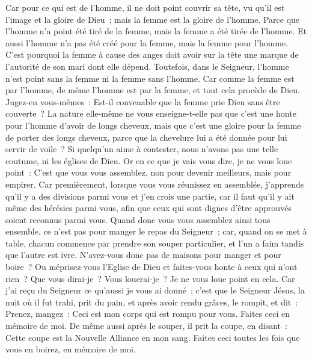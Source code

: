 \begin{multicols}{2}
Car pour ce qui est de l'homme, il ne doit point couvrir sa tête, vu qu'il est l'image et la gloire de Dieu~; mais la femme est la gloire de l'homme.
Parce que l'homme n'a point été tiré de la femme, mais la femme a été tirée de l'homme.
Et aussi l'homme n'a pas été créé pour la femme, mais la femme pour l'homme.
C'est pourquoi la femme à cause des anges doit avoir sur la tête une marque de l'autorité de son mari dont elle dépend.
Toutefois, dans le Seigneur, l'homme n'est point sans la femme ni la femme sans l'homme.
Car comme la femme est par l'homme, de même l'homme est par la femme, et tout cela procède de Dieu.
Jugez-en vous-mêmes~: Est-il convenable que la femme prie Dieu sans être couverte~?
La nature elle-même ne vous enseigne-t-elle pas que c'est une honte pour l'homme d'avoir de longs cheveux,
mais que c'est une gloire pour la femme de porter des longs cheveux, parce que la chevelure lui a été donnée pour lui servir de voile~?
Si quelqu'un aime à contester, nous n'avons pas une telle coutume, ni les églises de Dieu.
Or en ce que je vais vous dire, je ne vous loue point~: C'est que vous vous assemblez, non pour devenir meilleurs, mais pour empirer.
Car premièrement, lorsque vous vous réunissez en assemblée, j'apprends qu'il y a des divisions parmi vous et j'en crois une partie,
car il faut qu'il y ait même des hérésies parmi vous, afin que ceux qui sont dignes d'être approuvés soient reconnus parmi vous.
Quand donc vous vous assemblez ainsi tous ensemble, ce n'est pas pour manger le repas du Seigneur~;
car, quand on se met à table, chacun commence par prendre son souper particulier, et l'un a faim tandis que l'autre est ivre.
N'avez-vous donc pas de maisons pour manger et pour boire~? Ou méprisez-vous l'Eglise de Dieu et faites-vous honte à ceux qui n'ont rien~? Que vous dirai-je~? Vous louerai-je~? Je ne vous loue point en cela.
Car j'ai reçu du Seigneur ce qu'aussi je vous ai donné~; c'est que le Seigneur Jésus, la nuit où il fut trahi, prit du pain,
et après avoir rendu grâces, le rompit, et dit~: Prenez, mangez~: Ceci est mon corps qui est rompu pour vous. Faites ceci en mémoire de moi.
De même aussi après le souper, il prit la coupe, en disant~: Cette coupe est la Nouvelle Alliance en mon sang. Faites ceci toutes les fois que vous en boirez, en mémoire de moi.

\end{multicols}
